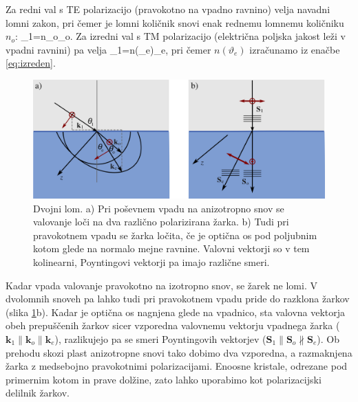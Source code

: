 Za redni val s TE polarizacijo (pravokotno na vpadno ravnino) velja navadni lomni zakon, pri čemer
je lomni količnik snovi enak rednemu lomnemu količniku $n_o$:
\beq
\sin\vartheta_{1}=n_{o}\sin\vartheta_{o}.
\eeq
Za izredni val s TM polarizacijo (električna poljska jakost leži v vpadni ravnini) pa velja
\beq
\sin\vartheta_{1}=n(\vartheta_e)\sin\vartheta_{e},
\eeq
pri čemer $n(\vartheta_e)$ izračunamo iz enačbe \ref{eq:izreden}.
\begin{figure}
\centering
\includegraphics[width=12truecm]{slike/01_dvolom.png}
\caption{\label{fig:dvolomnost}Dvojni lom. a) Pri poševnem vpadu na anizotropno snov se
valovanje loči na dva različno polarizirana žarka. b) Tudi pri pravokotnem vpadu se žarka 
ločita, če je optična os pod poljubnim kotom glede na normalo mejne ravnine. Valovni vektorji
so v tem kolinearni, Poyntingovi vektorji pa imajo različne smeri.}
\end{figure}


Kadar vpada valovanje pravokotno na izotropno snov, se žarek ne lomi. V 
dvolomnih snoveh pa lahko tudi pri pravokotnem vpadu pride do razklona žarkov (slika
\ref{fig:dvolomnost}b). Kadar je optična os nagnjena glede na vpadnico, sta valovna vektorja
obeh prepuščenih žarkov sicer vzporedna valovnemu vektorju vpadnega žarka ($\mathbf{k}_1 \parallel
\mathbf{k}_o \parallel \mathbf{k}_e$), razlikujejo pa se smeri Poyntingovih vektorjev
($\mathbf{S}_1 \parallel \mathbf{S}_o \nparallel \mathbf{S}_e$). Ob prehodu skozi 
plast anizotropne snovi tako dobimo dva vzporedna, a razmaknjena žarka z medsebojno
pravokotnimi polarizacijami. Enoosne kristale, odrezane pod primernim kotom in prave dolžine,
zato lahko uporabimo kot polarizacijski delilnik žarkov.

